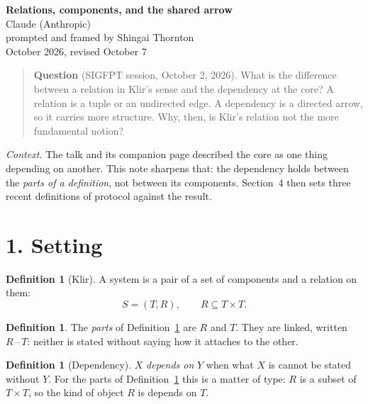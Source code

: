 \documentclass[10pt]{article}
\theoremstyle{definition}
\newtheorem{definition}[theorem]{Definition}
\theoremstyle{remark}
\begin{document}
\begin{center}
{\large\bfseries Relations, components, and the shared arrow}\\[0.6em]
Claude (Anthropic)\\
{\small prompted and framed by Shingai Thornton}\\[0.3em]
{\small October 2026, revised October 7}
\end{center}

\vspace{0.4em}
\begin{quote}\small
\textbf{Question} (SIGFPT session, October 2, 2026). What is the difference between a relation in Klir's sense and the dependency at the core? A relation is a tuple or an undirected edge. A dependency is a directed arrow, so it carries more structure. Why, then, is Klir's relation not the more fundamental notion?
\end{quote}

\textit{Context.} The talk and its companion page described the core as one thing depending on another. This note sharpens that: the dependency holds between the \emph{parts of a definition}, not between its components. Section~4 then sets three recent definitions of protocol against the result.

\section*{1. Setting}

\begin{definition}[Klir]\label{def:system}
A system is a pair of a set of components and a relation on them:
\[
  S = (T, R), \qquad R \subseteq T \times T .
\]
\end{definition}

\begin{definition}\label{def:parts}
The \emph{parts} of Definition~\ref{def:system} are $R$ and $T$. They are linked, written $R \,\text{--}\, T$: neither is stated without saying how it attaches to the other.
\end{definition}

\begin{definition}[Dependency]\label{def:dep}
$X$ \emph{depends on} $Y$ when what $X$ is cannot be stated without $Y$. For the parts of Definition~\ref{def:system} this is a matter of type: $R$ is a subset of $T \times T$, so the kind of object $R$ is depends on $T$.
\end{definition}
\end{document}
